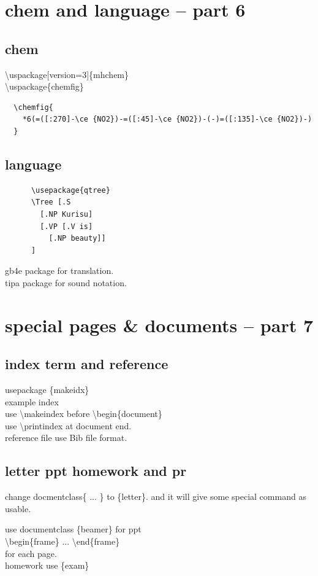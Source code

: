 \documentclass[11pt,a4paper]{article}
\begin{document}
\section{chem and language -- part 6}{
  \subsection{chem}{
    \textbackslash{}uspackage[version=3]\{mhchem\} \\
    \textbackslash{}uspackage\{chemfig\} \\    
                  {
\begin{verbatim}
  \chemfig{
    *6(=([:270]-\ce {NO2})-=([:45]-\ce {NO2})-(-)=([:135]-\ce {NO2})-)
  }
\end{verbatim}
                  }
  }
  
  \subsection{language}{
    {
\begin{verbatim}
      \usepackage{qtree}
      \Tree [.S
        [.NP Kurisu]
        [.VP [.V is]
          [.NP beauty]]
      ]
\end{verbatim}
    }
    gb4e package for translation. \\
    tipa package for sound notation.
  }
}

\section{special pages \& documents -- part 7}{
  \subsection{index term and reference}{
    usepackage \{makeidx\}\\
    example index \\
    use \textbackslash{}makeindex before \textbackslash{}begin\{document\} \\
    use \textbackslash{}printindex at document end. \\
    reference file use Bib file format.
  }
  \subsection{letter ppt homework and pr}{
    change \textbacksllash{}docmentclass\{ ... \} to \{letter\}.
    and it will give some special command as usable.

    use documentclass \{beamer\} for ppt \\
    \textbackslash{}begin\{frame\} ... \textbackslash{}end\{frame\} \\
    for each page.\\

    homework use \{exam\}
  }
}

\printindex %
\end{document}
